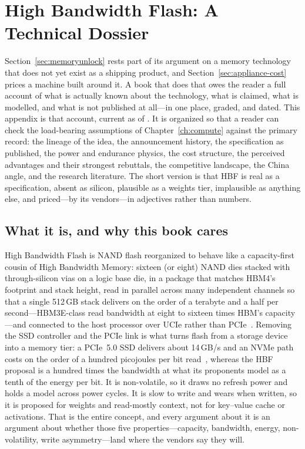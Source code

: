 \chapter{High Bandwidth Flash: A Technical Dossier}
\label{app:hbf}

Section~\ref{sec:memoryunlock} rests part of its argument on a memory technology that does not yet exist as a shipping product, and Section~\ref{sec:appliance-cost} prices a machine built around it. A book that does that owes the reader a full account of what is actually known about the technology, what is claimed, what is modelled, and what is not published at all---in one place, graded, and dated. This appendix is that account, current as of \datafreeze. It is organized so that a reader can check the load-bearing assumptions of Chapter~\ref{ch:compute} against the primary record: the lineage of the idea, the announcement history, the specification as published, the power and endurance physics, the cost structure, the perceived advantages and their strongest rebuttals, the competitive landscape, the China angle, and the research literature. The short version is that HBF is real as a specification, absent as silicon, plausible as a weights tier, implausible as anything else, and priced---by its vendors---in adjectives rather than numbers.

\section{What it is, and why this book cares}

High Bandwidth Flash is NAND flash reorganized to behave like a capacity-first cousin of High Bandwidth Memory: sixteen (or eight) NAND dies stacked with through-silicon vias on a logic base die, in a package that matches HBM4's footprint and stack height, read in parallel across many independent channels so that a single 512\,GB stack delivers on the order of a terabyte and a half per second---HBM3E-class read bandwidth at eight to sixteen times HBM's capacity---and connected to the host processor over UCIe rather than PCIe~\cite{sandisk-hbf-facts,hbf-ocp,hbf-spec}. Removing the SSD controller and the PCIe link is what turns flash from a storage device into a memory tier: a PCIe~5.0 SSD delivers about 14\,GB/s and an NVMe path costs on the order of a hundred picojoules per bit read~\cite{ssd-energy}, whereas the HBF proposal is a hundred times the bandwidth at what its proponents model as a tenth of the energy per bit. It is non-volatile, so it draws no refresh power and holds a model across power cycles. It is slow to write and wears when written, so it is proposed for weights and read-mostly context, not for key--value cache or activations. That is the entire concept, and every argument about it is an argument about whether those five properties---capacity, bandwidth, energy, non-volatility, write asymmetry---land where the vendors say they will.

